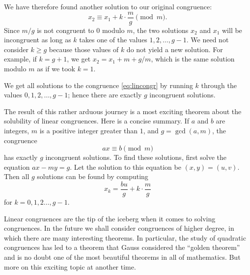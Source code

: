 We have therefore found another solution to our original congruence:
\[x_2\equiv x_1+k\cdot\frac{m}{g}\pmod{m}.\]
Since \(m/g\) is not congruent to \(0\) modulo \(m\), the two solutions \(x_2\) and \(x_1\) will be
incongruent as long as \(k\) takes one of the values \(1,2,\ldots,g-1\). We need not consider \(k\ge g\)
because those values of \(k\) do not yield a new solution. For example, if \(k=g+1\), we get
\(x_2=x_1+m+g/m\), which is the same solution modulo \(m\) as if we took \(k=1\).

We get all solutions to the congruence \eqref{eq:lincongr} by running \(k\) through the values
\(0,1,2,\ldots, g-1\); hence there are exactly \(g\) incongruent solutions.

The result of this rather arduous journey is a most exciting theorem about the solubility
of linear congruences. Here is a concise summary. If \(a\) and \(b\) are integers, \(m\)
is a positive integer greater than \(1\), and \(g=\gcd(a,m)\), the congruence \[ax\equiv b\pmod{m}\] has exactly
\(g\) incongruent solutions. To find these solutions, first solve the equation
\(ax-my=g\). Let the solution to this equation be \((x,y)=(u,v)\). Then all \(g\) solutions can be found
by computing
\[x_k=\frac{bu}{g}+k\cdot\frac{m}{g}\]
for \(k=0,1,2\ldots,g-1\).

Linear congruences are the tip of the iceberg when it comes to solving congruences. In the future we shall
consider congruences of higher degree, in which there are many interesting theorems. In particular,
the study of quadratic congruences has led to a theorem that Gauss considered the ``golden theorem'' and
is no doubt one of the most beautiful theorems in all of mathematics. But more
on this exciting topic at another time.
